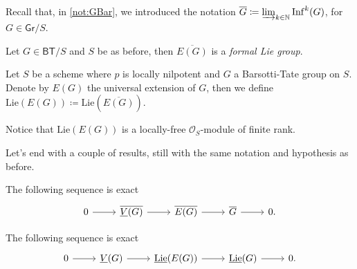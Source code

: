 \noindent
Recall that, in \cref{not:GBar}, we introduced the notation
$\overline{G} \coloneqq \varinjlim_{k \in \mathbb{N}} \mathrm{Inf}^k(G)$,
for $G \in \mathsf{Gr}/S$.


\begin{prop}\label{prop:ExtFLG}
	Let $G \in \mathsf{BT}/S$ and $S$ be as before,
	then $\overline{E(G)}$ is a {\em formal Lie group}.
\end{prop} 


\begin{defn}[]
	Let $S$ be a scheme where $p$ is locally nilpotent and $G$
	a Barsotti-Tate group on $S$.
	Denote by $E(G)$ the universal extension of $G$, then we define
	$\mathrm{Lie}(E(G)) \coloneqq \mathrm{Lie}(\overline{E(G)})$.
\end{defn}


\begin{rem}[]
	Notice that $\mathrm{Lie}(E(G))$ is a locally-free
	$\mathcal{O}_{ S }$-module of finite rank.
\end{rem}


\noindent
Let's end with a couple of results, still with the same notation and hypothesis as before.
\begin{prop}
	The following sequence is exact
	\begin{equation*}
	\begin{tikzcd}
		0 \arrow[r, "", rightarrow] &
		\overline{\underline{V}(G)} \arrow[r, "", rightarrow] &
		\overline{E(G)} \arrow[r, "", rightarrow] &
		\overline{G} \arrow[r, "", rightarrow] &
		0
	.\end{tikzcd}
	\end{equation*}
\end{prop} 


\begin{prop}\label{SESDieudonneCrystalEvaluation}
	The following sequence is exact
	\begin{equation*}
	\begin{tikzcd}
		0 \arrow[r, "", rightarrow] &
		\underline{V}(G) \arrow[r, "", rightarrow] &
		\underline{\mathrm{Lie}}(E(G)) \arrow[r, "", rightarrow] &
		\underline{\mathrm{Lie}}(G) \arrow[r, "", rightarrow] &
		0
	.\end{tikzcd}
	\end{equation*}
\end{prop} 



